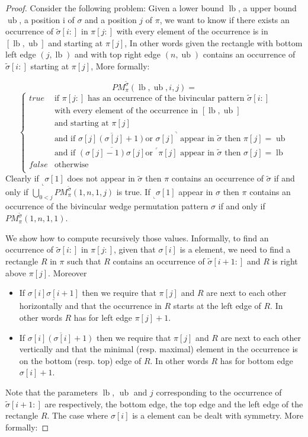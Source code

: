 \documentclass[a4paper]{llncs}
\newcommand{\RLMin}{\text{RLMin}}
\newcommand{\RLMax}{\text{RLMax}}
\newcommand{\ptext}{\pi}
\newcommand{\PM}{PM}
\DeclareMathOperator{\lb}{lb}
\DeclareMathOperator{\ub}{ub}
\begin{document}
\begin{proof}
Consider the following problem:
Given a lower bound $\lb$, a upper bound $\ub$, a position i of $\sigma$
and a position $j$ of $\pi$, we want to know if
there exists an occurrence of $\widetilde{\sigma}[i:]$ in $\ptext[j:]$
with every element of the occurrence is in $[\lb,\ub]$
and starting at $\pi[j]$,
In other words given the rectangle with bottom left edge
$(j,\lb)$ and with top right edge $(n,\ub)$
contains an occurrence of $\widetilde{\sigma}[i:]$
starting at $\pi[j]$,
More formally:

$$
\PM^{\widetilde{\sigma}}_{\ptext}(\lb,\ub,i,j)=
$$
$$
\begin{cases}
	true 	& \text{if $\ptext[j:]$ has an occurrence of the bivincular pattern $\widetilde{\sigma}[i:]$ }\\
			& \text{with every element of the occurrence in $[\lb,\ub]$}\\
			& \text{and starting at $\pi[j]$}\\
			& \text{and if $\overline{\sigma[j](\sigma[j]+1)}$
			 or $\sigma[j]^\urcorner$ appear in $\widetilde{\sigma}$ then $\pi[j]=\ub$} \\
			& \text{and if $\overline{(\sigma[j]-1)\sigma[j]}$
			 or $^\ulcorner{\pi[j]}$ appear in $\widetilde{\sigma}$ then $\sigma[j]=\lb$} \\
	false 	& \text{otherwise}\\
\end{cases}
$$
Clearly if $_\llcorner{\sigma[1]}$ does not appear in $\widetilde{\sigma}$
then $\pi$ contains an occurrence of $\widetilde{\sigma}$ 
if and only if $\bigcup_{0<j} \PM^{\widetilde{\sigma}}_{\ptext}(1,n,1,j)$ is true.
If $_\llcorner{\sigma[1]}$ appear in $\sigma$ then 
$\pi$ contains an occurrence of 
the bivincular wedge permutation pattern $\sigma$ 
if and only if $\PM^{\widetilde{\sigma}}_{\ptext}(1,n,1,1)$.

We show how to compute recursively those values.
Informally, to find an occurrence of $\widetilde{\sigma}[i:]$ in $\pi[j:]$,
given that $\sigma[i]$ is a \RLMin element,
we need to find a rectangle $R$ in $\pi$
such that $R$ contains an occurrence of $\widetilde{\sigma}[i+1:]$
and $R$ is right above $\pi[j]$.
Moreover
\begin{itemize}
\item If $\underline{\sigma[i]\sigma[i+1]}$ then
we require that $\pi[j]$ and $R$ are next to each other horizontally
and that the occurrence in $R$ starts at the left edge of $R$.
In other words $R$ has for left edge $\pi[j]+1$.
\item If $\overline{\sigma[i](\sigma[i]+1)}$ then
we require that $\pi[j]$ and $R$ are next to each other vertically
and that the minimal (resp. maximal) element in the occurrence
is on the bottom (resp. top) edge of $R$.
In other words $R$ has for bottom edge $\sigma[i]+1$.
\end{itemize}
Note that the parameters $\lb$, $\ub$ and $j$ corresponding
to the occurrence of $\widetilde{\sigma}[i+1:]$ are respectively,
the bottom edge, the top edge and the left edge of the rectangle $R$.
The case where $\sigma[i]$ is a \RLMax element can be dealt with symmetry.
More formally:


\end{proof}
\end{document}
